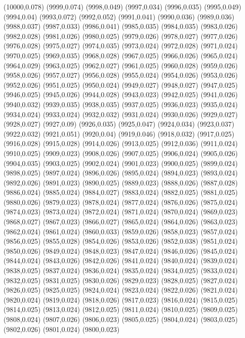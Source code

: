 (10000,0.078)
(9999,0.074)
(9998,0.049)
(9997,0.034)
(9996,0.035)
(9995,0.049)
(9994,0.04)
(9993,0.072)
(9992,0.052)
(9991,0.041)
(9990,0.036)
(9989,0.036)
(9988,0.037)
(9987,0.033)
(9986,0.041)
(9985,0.035)
(9984,0.035)
(9983,0.026)
(9982,0.028)
(9981,0.026)
(9980,0.025)
(9979,0.026)
(9978,0.027)
(9977,0.026)
(9976,0.028)
(9975,0.027)
(9974,0.035)
(9973,0.024)
(9972,0.028)
(9971,0.024)
(9970,0.025)
(9969,0.035)
(9968,0.028)
(9967,0.025)
(9966,0.026)
(9965,0.024)
(9964,0.029)
(9963,0.025)
(9962,0.027)
(9961,0.025)
(9960,0.028)
(9959,0.026)
(9958,0.026)
(9957,0.027)
(9956,0.028)
(9955,0.024)
(9954,0.026)
(9953,0.026)
(9952,0.026)
(9951,0.025)
(9950,0.024)
(9949,0.027)
(9948,0.027)
(9947,0.025)
(9946,0.025)
(9945,0.026)
(9944,0.028)
(9943,0.023)
(9942,0.025)
(9941,0.026)
(9940,0.032)
(9939,0.035)
(9938,0.035)
(9937,0.025)
(9936,0.023)
(9935,0.024)
(9934,0.024)
(9933,0.024)
(9932,0.032)
(9931,0.024)
(9930,0.026)
(9929,0.027)
(9928,0.027)
(9927,0.09)
(9926,0.035)
(9925,0.047)
(9924,0.034)
(9923,0.037)
(9922,0.032)
(9921,0.051)
(9920,0.04)
(9919,0.046)
(9918,0.032)
(9917,0.025)
(9916,0.028)
(9915,0.028)
(9914,0.026)
(9913,0.025)
(9912,0.036)
(9911,0.024)
(9910,0.025)
(9909,0.023)
(9908,0.026)
(9907,0.025)
(9906,0.024)
(9905,0.026)
(9904,0.035)
(9903,0.025)
(9902,0.024)
(9901,0.023)
(9900,0.025)
(9899,0.024)
(9898,0.025)
(9897,0.024)
(9896,0.026)
(9895,0.024)
(9894,0.023)
(9893,0.024)
(9892,0.026)
(9891,0.023)
(9890,0.025)
(9889,0.023)
(9888,0.026)
(9887,0.028)
(9886,0.024)
(9885,0.024)
(9884,0.027)
(9883,0.024)
(9882,0.025)
(9881,0.025)
(9880,0.026)
(9879,0.023)
(9878,0.024)
(9877,0.024)
(9876,0.026)
(9875,0.024)
(9874,0.023)
(9873,0.024)
(9872,0.024)
(9871,0.024)
(9870,0.024)
(9869,0.023)
(9868,0.027)
(9867,0.023)
(9866,0.027)
(9865,0.024)
(9864,0.026)
(9863,0.023)
(9862,0.024)
(9861,0.024)
(9860,0.033)
(9859,0.026)
(9858,0.023)
(9857,0.024)
(9856,0.025)
(9855,0.028)
(9854,0.026)
(9853,0.026)
(9852,0.038)
(9851,0.024)
(9850,0.026)
(9849,0.024)
(9848,0.023)
(9847,0.024)
(9846,0.026)
(9845,0.024)
(9844,0.024)
(9843,0.026)
(9842,0.026)
(9841,0.024)
(9840,0.024)
(9839,0.024)
(9838,0.025)
(9837,0.024)
(9836,0.024)
(9835,0.024)
(9834,0.025)
(9833,0.024)
(9832,0.025)
(9831,0.025)
(9830,0.026)
(9829,0.023)
(9828,0.025)
(9827,0.024)
(9826,0.025)
(9825,0.025)
(9824,0.024)
(9823,0.024)
(9822,0.026)
(9821,0.024)
(9820,0.024)
(9819,0.024)
(9818,0.026)
(9817,0.023)
(9816,0.024)
(9815,0.025)
(9814,0.025)
(9813,0.024)
(9812,0.025)
(9811,0.024)
(9810,0.025)
(9809,0.025)
(9808,0.024)
(9807,0.026)
(9806,0.023)
(9805,0.025)
(9804,0.024)
(9803,0.025)
(9802,0.026)
(9801,0.024)
(9800,0.023)
